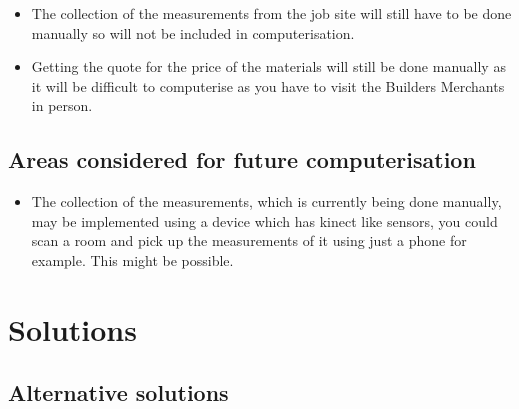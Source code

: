 	\begin{itemize}
		\item The collection of the measurements from the job site will still have to be done manually so will not be included in computerisation.
		\item Getting the quote for the price of the materials will still be done manually as it will be difficult to computerise as you have to visit the Builders Merchants in person.
	\end{itemize}

\subsection{Areas considered for future computerisation}
	\begin{itemize}
		\item The collection of the measurements, which is currently being done manually, may be implemented using a device which has kinect like sensors, you could scan a room and pick up the measurements of it using just a phone for example. This might be possible.
	\end{itemize}

\pagebreak
\section{Solutions}

\subsection{Alternative solutions}

